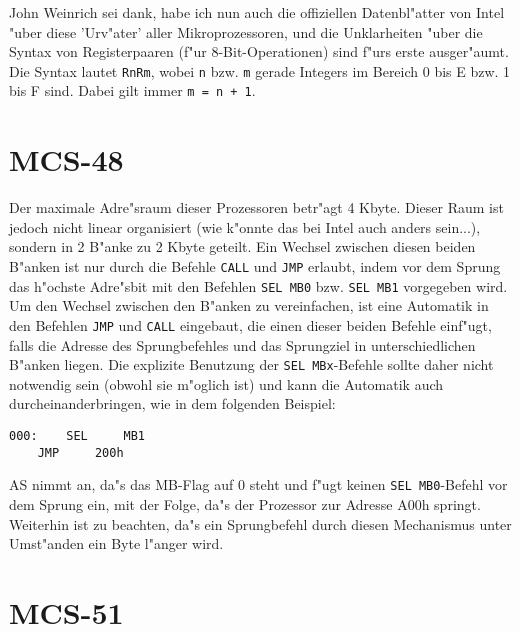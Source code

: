 \documentclass[12pt,a4paper,twoside]{report}
\newcommand{\tty}[1]{{\tt #1}}
\begin{document}
John Weinrich sei dank, habe ich nun auch die offiziellen Datenbl"atter
von Intel "uber diese 'Urv"ater' aller Mikroprozessoren, und die
Unklarheiten "uber die Syntax von Registerpaaren (f"ur 8-Bit-Operationen)
sind f"urs erste ausger"aumt.  Die Syntax lautet \tty{RnRm}, wobei \tty{n}
bzw. \tty{m} gerade Integers im Bereich 0 bis E bzw. 1 bis F sind.  Dabei
gilt immer \tty{m = n + 1}.


\section{MCS-48}

Der maximale Adre"sraum dieser Prozessoren betr"agt 4 Kbyte.  Dieser Raum
ist jedoch nicht linear organisiert (wie k"onnte das bei Intel auch anders
sein...), sondern in 2 B"anke zu 2 Kbyte geteilt.  Ein Wechsel zwischen
diesen beiden B"anken ist nur durch die Befehle \tty{CALL} und \tty{JMP}
erlaubt, indem vor dem Sprung das h"ochste Adre"sbit mit den Befehlen
\tty{SEL MB0} bzw. \tty{SEL MB1} vorgegeben wird.
Um den Wechsel zwischen den B"anken zu vereinfachen, ist
eine Automatik in den Befehlen \tty{JMP} und \tty{CALL} eingebaut, die einen dieser
beiden Befehle einf"ugt, falls die Adresse des Sprungbefehles und das
Sprungziel in unterschiedlichen B"anken liegen.  Die explizite Benutzung der
\tty{SEL MBx}-Befehle sollte daher nicht notwendig sein (obwohl sie m"oglich
ist) und kann die Automatik auch durcheinanderbringen, wie in dem folgenden
Beispiel:
\begin{verbatim}
000:    SEL     MB1
	JMP     200h
\end{verbatim}
AS nimmt an, da"s das MB-Flag auf 0 steht und f"ugt keinen
\tty{SEL MB0}-Befehl vor dem Sprung ein, mit der Folge, da"s der
Prozessor zur Adresse A00h springt.
Weiterhin ist zu beachten, da"s ein Sprungbefehl durch diesen Mechanismus
unter Umst"anden ein Byte l"anger wird.


\section{MCS-51}
\end{document}

